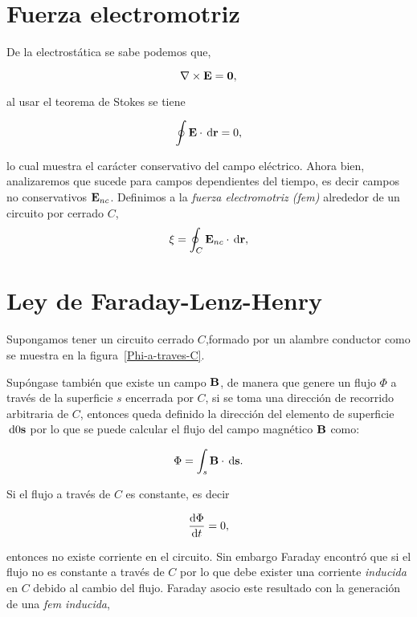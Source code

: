 \section{Fuerza electromotriz}
De la electrostática se sabe podemos que,

\begin{equation*}
	\nabla \times \textbf{E} = \textbf{0},
\end{equation*}

al usar el teorema de Stokes se tiene

\begin{equation}
	\label{Eq:CampoEConservativo}
	\oint \E \cdot \dl{\textbf{r}} = 0,
\end{equation}

lo cual muestra el carácter conservativo del campo eléctrico. Ahora bien, analizaremos que sucede para campos dependientes del tiempo, es decir campos no conservativos  $\textbf{E}_{nc}$. Definimos a la \emph{fuerza electromotriz (fem)} alrededor de un circuito por cerrado $C$,
\begin{equation}
	\label{Eq:Fza Electromotriz}
	\xi = \oint_{C} \E_{nc} \cdot \dl{\textbf{r}},
\end{equation}

\section{Ley de Faraday-Lenz-Henry}

Supongamos tener un circuito cerrado $C$,formado por un alambre conductor como se muestra en la figura~\ref{Phi-a-traves-C}.

Supóngase también que existe un campo $\textbf{B}$, de manera que genere un flujo $\Phi$ a través de la superficie $s$ encerrada por $C$, si se toma una dirección de recorrido arbitraria de $C$, entonces queda definido la dirección del elemento de superficie $\dl 0 \textbf{s}$ por lo que se puede calcular el flujo del campo magnético $\textbf{B}$ como:

\begin{equation}
	\Phi = \int_{s} \B \cdot \dl{\textbf{s}}.
	\label{Eq:FlujoMagnetico}
\end{equation}

Si el flujo a través de $C$ es constante, es decir

\begin{equation*}
	\diff{\Phi}{t} = 0,
\end{equation*}

entonces no existe corriente en el circuito. Sin embargo Faraday encontró que si el flujo no es constante a través de $C$ por lo que debe exister una corriente \emph{inducida} en $C$ debido al cambio del flujo. Faraday asocio este resultado con la generación de una \emph{fem inducida},

